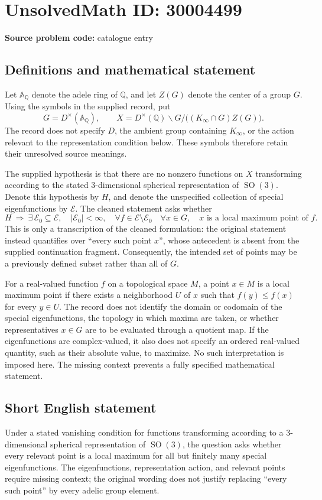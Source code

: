 \documentclass[11pt]{article}
\newcommand{\Q}{\mathbb{Q}}
\newcommand{\A}{\mathbb{A}}
\begin{document}
\section*{UnsolvedMath ID: 30004499}
\textbf{Source problem code:} catalogue entry
\subsection{Definitions and mathematical statement}
Let \(\A_{\Q}\) denote the adele ring of \(\Q\), and let \(Z(G)\) denote the center of a group \(G\). Using the symbols in the supplied record, put
\[
G=D^{\times}(\A_{\Q}),\qquad
X=D^{\times}(\Q)\backslash G/\bigl((K_\infty\cap G)Z(G)\bigr).
\]
The record does not specify \(D\), the ambient group containing \(K_\infty\), or the action relevant to the representation condition below. These symbols therefore retain their unresolved source meanings.

The supplied hypothesis is that there are no nonzero functions on \(X\) transforming according to the stated \(3\)-dimensional spherical representation of \(\operatorname{SO}(3)\). Denote this hypothesis by \(H\), and denote the unspecified collection of special eigenfunctions by \(\mathcal E\). The cleaned statement asks whether
\[
H\ \Longrightarrow\
\exists\,\mathcal E_0\subseteq\mathcal E,\quad
|\mathcal E_0|<\infty,\quad
\forall f\in\mathcal E\setminus\mathcal E_0\quad
\forall x\in G,\quad
\text{\(x\) is a local maximum point of \(f\)}.
\]
This is only a transcription of the cleaned formulation: the original statement instead quantifies over ``every such point \(x\)'', whose antecedent is absent from the supplied continuation fragment. Consequently, the intended set of points may be a previously defined subset rather than all of \(G\).

For a real-valued function \(f\) on a topological space \(M\), a point \(x\in M\) is a local maximum point if there exists a neighborhood \(U\) of \(x\) such that \(f(y)\leq f(x)\) for every \(y\in U\). The record does not identify the domain or codomain of the special eigenfunctions, the topology in which maxima are taken, or whether representatives \(x\in G\) are to be evaluated through a quotient map. If the eigenfunctions are complex-valued, it also does not specify an ordered real-valued quantity, such as their absolute value, to maximize. No such interpretation is imposed here. The missing context prevents a fully specified mathematical statement.
\subsection{Short English statement}
Under a stated vanishing condition for functions transforming according to a \(3\)-dimensional spherical representation of \(\operatorname{SO}(3)\), the question asks whether every relevant point is a local maximum for all but finitely many special eigenfunctions. The eigenfunctions, representation action, and relevant points require missing context; the original wording does not justify replacing ``every such point'' by every adelic group element.
\end{document}
